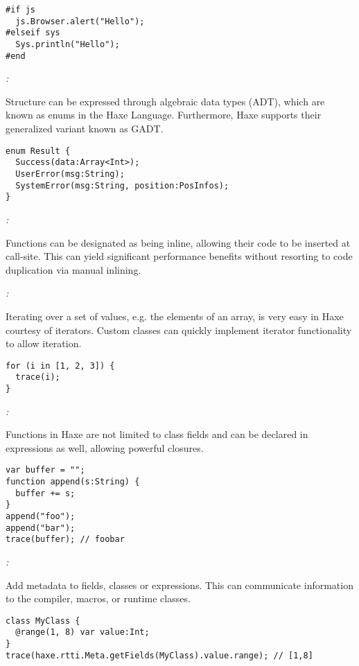 \begin{lstlisting}
#if js
  js.Browser.alert("Hello");
#elseif sys
  Sys.println("Hello");
#end
\end{lstlisting}

\emph{:}

Structure can be expressed through algebraic data types (ADT), which are known as enums in the Haxe Language. Furthermore, Haxe supports their generalized variant known as GADT.

\begin{lstlisting}
enum Result {
  Success(data:Array<Int>);
  UserError(msg:String);
  SystemError(msg:String, position:PosInfos);
}
\end{lstlisting}

\emph{:}

Functions can be designated as being inline, allowing their code to be inserted at call-site. This can yield significant performance benefits without resorting to code duplication via manual inlining.

\emph{:}

Iterating over a set of values, e.g. the elements of an array, is very easy in Haxe courtesy of iterators. Custom classes can quickly implement iterator functionality to allow iteration.

\begin{lstlisting}
for (i in [1, 2, 3]) {
  trace(i);
}
\end{lstlisting}

\emph{:}

Functions in Haxe are not limited to class fields and can be declared in expressions as well, allowing powerful closures.

\begin{lstlisting}
var buffer = "";
function append(s:String) {
  buffer += s;
}
append("foo");
append("bar");
trace(buffer); // foobar
\end{lstlisting}

\emph{:}

Add metadata to fields, classes or expressions. This can communicate information to the compiler, macros, or runtime classes.

\begin{lstlisting}
class MyClass {
  @range(1, 8) var value:Int;
}
trace(haxe.rtti.Meta.getFields(MyClass).value.range); // [1,8]
\end{lstlisting}

